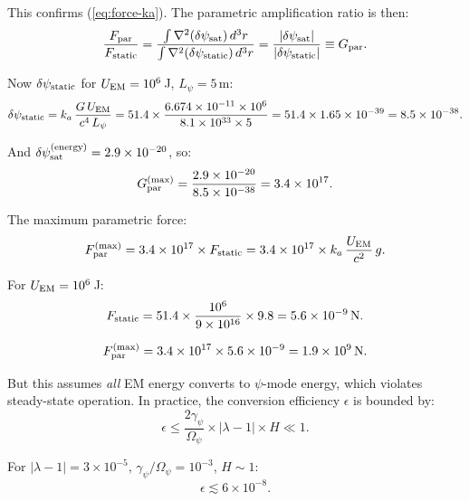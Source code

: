 \documentclass[11pt]{article}
\newcommand{\ka}{k_a}
\begin{document}
This confirms (\ref{eq:force-ka}). The parametric amplification ratio is then:
\begin{equation}
\frac{F_{\rm par}}{F_{\rm static}}
  = \frac{\int \nabla^2(\delta\psi_{\rm sat})\,d^3r}
    {\int \nabla^2(\delta\psi_{\rm static})\,d^3r}
  = \frac{|\delta\psi_{\rm sat}|}{|\delta\psi_{\rm static}|} \equiv G_{\rm par}.
\end{equation}

Now $\delta\psi_{\rm static}$ for $U_{\rm EM} = 10^6$\,J, $L_\psi = 5$\,m:
\begin{equation}
\delta\psi_{\rm static} = \ka\,\frac{G\,U_{\rm EM}}{c^4\,L_\psi}
  = 51.4 \times \frac{6.674 \times 10^{-11} \times 10^6}{8.1 \times 10^{33} \times 5}
  = 51.4 \times 1.65 \times 10^{-39}
  = 8.5 \times 10^{-38}.
\end{equation}

And $\delta\psi_{\rm sat}^{(\rm energy)} = 2.9 \times 10^{-20}$, so:
\begin{equation}
G_{\rm par}^{(\rm max)} = \frac{2.9 \times 10^{-20}}{8.5 \times 10^{-38}}
  = 3.4 \times 10^{17}.
\end{equation}

The maximum parametric force:
\begin{equation}
F_{\rm par}^{(\rm max)} = 3.4 \times 10^{17} \times F_{\rm static}
  = 3.4 \times 10^{17} \times \ka\,\frac{U_{\rm EM}}{c^2}\,g.
\end{equation}

For $U_{\rm EM} = 10^6$\,J:
\begin{equation}
F_{\rm static} = 51.4 \times \frac{10^6}{9 \times 10^{16}} \times 9.8
  = 5.6 \times 10^{-9}\,\text{N}.
\end{equation}

\begin{equation}
F_{\rm par}^{(\rm max)} = 3.4 \times 10^{17} \times 5.6 \times 10^{-9}
  = 1.9 \times 10^{9}\,\text{N}.
\end{equation}

But this assumes \textit{all} EM energy converts to $\psi$-mode energy,
which violates steady-state operation. In practice, the conversion
efficiency $\epsilon$ is bounded by:
\begin{equation}
\epsilon \leq \frac{2\gamma_\psi}{\Omega_\psi} \times |\lambda - 1| \times H
  \ll 1.
\end{equation}

For $|\lambda - 1| = 3 \times 10^{-5}$,
$\gamma_\psi/\Omega_\psi = 10^{-3}$, $H \sim 1$:
\begin{equation}
\epsilon \lesssim 6 \times 10^{-8}.
\end{equation}
\end{document}
